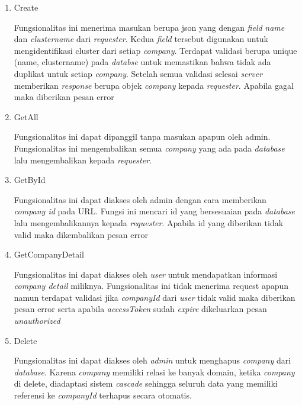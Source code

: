 \begin{enumerate}
  \item Create

        Fungsionalitas ini menerima masukan berupa json yang dengan \textit{field} \textit{name} dan \textit{cluster\textunderscore name} dari \textit{requester}. Kedua \textit{field} tersebut digunakan untuk mengidentifikasi cluster dari setiap \textit{company}. Terdapat validasi berupa unique (name, cluster\textunderscore name) pada \textit{databse} untuk memastikan bahwa tidak ada duplikat untuk setiap \textit{company}. Setelah semua validasi selesai \textit{server} memberikan \textit{response} berupa objek \textit{company} kepada \textit{requester}. Apabila gagal maka diberikan pesan error

  \item GetAll

        Fungsionalitas ini dapat dipanggil tanpa masukan apapun oleh admin. Fungsionalitas ini mengembalikan semua \textit{company} yang ada pada \textit{database} lalu mengembalikan kepada \textit{requester}.

  \item GetById

        Fungsionalitas ini dapat diakses oleh admin dengan cara memberikan \textit{company id} pada URL. Fungsi ini mencari id yang bersesuaian pada \textit{database} lalu mengembalikannya kepada \textit{requester}. Apabila id yang diberikan tidak valid maka dikembalikan pesan error

  \item GetCompanyDetail

        Fungsionalitas ini dapat diakses oleh \textit{user} untuk mendapatkan informasi \textit{company detail} miliknya. Fungsionalitas ini tidak menerima request apapun namun terdapat validasi jika \textit{companyId} dari \textit{user} tidak valid maka diberikan pesan error serta apabila \textit{accessToken} sudah \textit{expire} dikeluarkan pesan \textit{unauthorized}

  \item Delete

        Fungsionalitas ini dapat diakses oleh \textit{admin} untuk menghapus \textit{company} dari \textit{database}. Karena \textit{company} memiliki relasi ke banyak domain, ketika \textit{company} di delete, diadaptasi sistem \textit{cascade} sehingga seluruh data yang memiliki referensi ke \textit{companyId} terhapus secara otomatis.

\end{enumerate}


